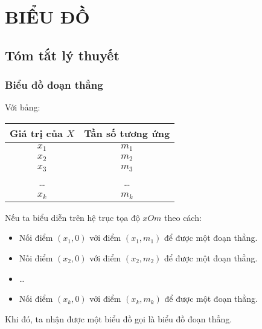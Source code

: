 \section{BIỂU ĐỒ}
\subsection{Tóm tắt lý thuyết}
\subsubsection{Biểu đồ đoạn thẳng}
Với bảng:
\begin{center}
\begin{tabular}{|c|c|}
\hline 
Giá trị của $X$ & Tần số tương ứng \\ 
\hline 
$x_1$ & $m_1$ \\ 
$x_2$ & $m_2$ \\ 
$x_3$ & $m_3$ \\ 
\ldots & \ldots \\ 
$x_k$ & $m_k$ \\ 
\hline 
\end{tabular} 
\end{center}
Nếu ta biểu diễn trên hệ trục tọa độ $xOm$ theo cách:
\begin{itemize}
\item Nối điểm $(x_1,0)$ với điểm $(x_1,m_1)$ để được một đoạn thẳng.
\item Nối điểm $(x_2,0)$ với điểm $(x_2,m_2)$ để được một đoạn thẳng.
\item \ldots
\item Nối điểm $(x_k,0)$ với điểm $(x_k,m_k)$ để được một đoạn thẳng.
\end{itemize}
Khi đó, ta nhận được một biểu đồ gọi là biểu đồ đoạn thẳng.
